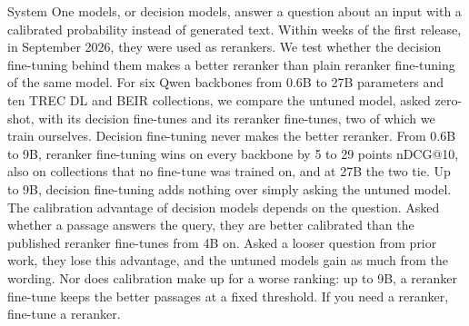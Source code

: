 System One models, or decision models, answer a question about an input with a calibrated probability instead of
generated text. Within weeks of the first release, in September 2026, they were used as rerankers. We test whether
the decision fine-tuning behind them makes a better reranker than plain reranker fine-tuning of the same model. For
six Qwen backbones from 0.6B to 27B parameters and ten TREC DL and BEIR collections, we compare the untuned model,
asked zero-shot, with its decision fine-tunes and its reranker fine-tunes, two of which we train ourselves. Decision
fine-tuning never makes the better reranker. From 0.6B to 9B, reranker fine-tuning wins on every backbone by 5 to 29
points nDCG@10, also on collections that no fine-tune was trained on, and at 27B the two tie. Up to 9B, decision
fine-tuning adds nothing over simply asking the untuned model. The calibration advantage of decision models depends
on the question. Asked whether a passage answers the query, they are better calibrated than the published reranker
fine-tunes from 4B on. Asked a looser question from prior work, they lose this advantage, and the untuned models gain
as much from the wording. Nor does calibration make up for a worse ranking: up to 9B, a reranker fine-tune keeps the
better passages at a fixed threshold. If you need a reranker, fine-tune a reranker.
